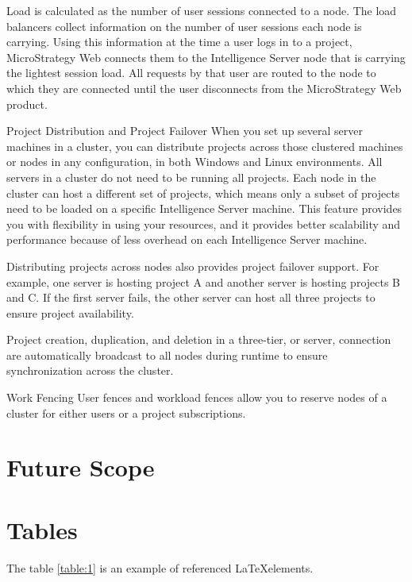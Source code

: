 \documentclass[12pt]{article}
\begin{document}
Load is calculated as the number of user sessions connected to a node. The load balancers collect information on the number of user sessions each node is carrying. Using this information at the time a user logs in to a project, MicroStrategy Web connects them to the Intelligence Server node that is carrying the lightest session load. All requests by that user are routed to the node to which they are connected until the user disconnects from the MicroStrategy Web product.

Project Distribution and Project Failover
When you set up several server machines in a cluster, you can distribute projects across those clustered machines or nodes in any configuration, in both Windows and Linux environments. All servers in a cluster do not need to be running all projects. Each node in the cluster can host a different set of projects, which means only a subset of projects need to be loaded on a specific Intelligence Server machine. This feature provides you with flexibility in using your resources, and it provides better scalability and performance because of less overhead on each Intelligence Server machine.

Distributing projects across nodes also provides project failover support. For example, one server is hosting project A and another server is hosting projects B and C. If the first server fails, the other server can host all three projects to ensure project availability.

Project creation, duplication, and deletion in a three-tier, or server, connection are automatically broadcast to all nodes during runtime to ensure synchronization across the cluster.

Work Fencing
User fences and workload fences allow you to reserve nodes of a cluster for either users or a project subscriptions. 

\newpage
\section{Future Scope}

%


\newpage
\section{Tables}
The table \ref{table:1} is an example of referenced \LaTeX elements.
\end{document}
